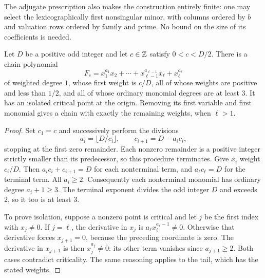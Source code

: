 The adjugate prescription also makes the construction entirely finite:
one may select the lexicographically first nonsingular minor, with
columns ordered by $b$ and valuation rows ordered by family and prime.
No bound on the size of its coefficients is needed.

\begin{lemma}\label{seed:chain}
Let $D$ be a positive odd integer and let $c\in\mathbb Z$ satisfy
$0<c<D/2$.  There is a chain
polynomial
\begin{equation}\label{seed:chain-polynomial}
 F_c=x_1^{a_1}x_2+\cdots+x_{\ell-1}^{a_{\ell-1}}x_\ell
       +x_\ell^{a_\ell}
\end{equation}
of weighted degree $1$, whose first weight is $c/D$, all of whose
weights are positive and less than $1/2$, and all of whose ordinary
monomial degrees are at least $3$.  It has an isolated critical point
at the origin.  Removing its first variable and first monomial gives
a chain with exactly the remaining weights, when $\ell>1$.
\end{lemma}

\begin{proof}
Set $c_1=c$ and successively perform the divisions
\[
 a_i=\lfloor D/c_i\rfloor,\qquad c_{i+1}=D-a_ic_i,
\]
stopping at the first zero remainder.  Each nonzero remainder is a
positive integer strictly smaller than its predecessor, so this
procedure terminates.
Give $x_i$ weight $c_i/D$.  Then $a_ic_i+c_{i+1}=D$ for each
nonterminal term, and $a_\ell c_\ell=D$ for the terminal term.
All $a_i\ge2$.  Consequently each nonterminal monomial has ordinary
degree $a_i+1\ge3$.  The terminal exponent divides the odd integer
$D$ and exceeds $2$, so it too is at least $3$.

To prove isolation, suppose a nonzero point is critical and let $j$
be the first index with $x_j\ne0$.  If $j=\ell$, the derivative in
$x_j$ is $a_\ell x_\ell^{a_\ell-1}\ne0$.  Otherwise that derivative
forces $x_{j+1}=0$, because the preceding coordinate is zero.  The
derivative in $x_{j+1}$ is then $x_j^{a_j}\ne0$: its other term
vanishes since $a_{j+1}\ge2$.  Both cases contradict criticality.
The same reasoning applies to the tail, which has the stated weights.
\end{proof}

